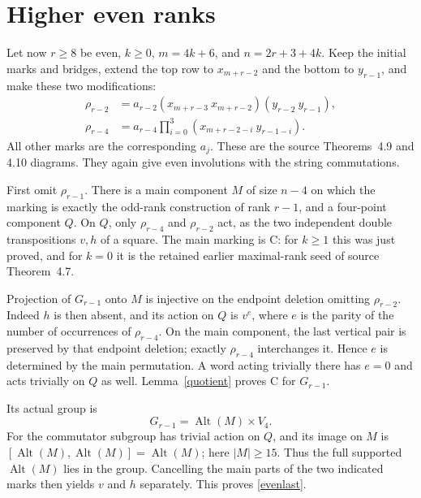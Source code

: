 \documentclass[11pt]{article}
\newcommand{\Alt}{\operatorname{Alt}}
\begin{document}
\section{Higher even ranks}
Let now $r\ge8$ be even, $k\ge0$, $m=4k+6$, and
$n=2r+3+4k$. Keep the initial marks and bridges, extend the top
row to $x_{m+r-2}$ and the bottom to $y_{r-1}$, and make these
two modifications:
\begin{align}
 \rho_{r-2}&=a_{r-2}
       (x_{m+r-3}\ x_{m+r-2})(y_{r-2}\ y_{r-1}),\label{extramatch}\\
 \rho_{r-4}&=a_{r-4}
       \prod_{i=0}^{3}(x_{m+r-2-i}\ y_{r-1-i}).\label{vertical4}
\end{align}
All other marks are the corresponding $a_j$. These are the
source Theorems~4.9 and 4.10 diagrams. They again give even
involutions with the string commutations.

First omit $\rho_{r-1}$. There is a main component $M$ of size
$n-4$ on which the marking is exactly the odd-rank construction
of rank $r-1$, and a four-point component $Q$. On $Q$, only
$\rho_{r-4}$ and $\rho_{r-2}$ act, as the two independent
double transpositions $v,h$ of a square. The main marking is C:
for $k\ge1$ this was just proved, and for $k=0$ it is the
retained earlier maximal-rank seed of source Theorem~4.7.

Projection of $G_{r-1}$ onto $M$ is injective on the endpoint
deletion omitting $\rho_{r-2}$. Indeed $h$ is then absent,
and its action on $Q$ is $v^e$, where $e$ is the parity of the
number of occurrences of $\rho_{r-4}$. On the main component,
the last vertical pair is preserved by that endpoint deletion;
exactly $\rho_{r-4}$ interchanges it. Hence $e$ is determined
by the main permutation. A word acting trivially there has
$e=0$ and acts trivially on $Q$ as well. Lemma~\ref{quotient}
proves C for $G_{r-1}$.

Its actual group is
\begin{equation}\label{evenlast}
 G_{r-1}=\Alt(M)\times V_4.
\end{equation}
For the commutator subgroup has trivial action on $Q$, and its
image on $M$ is $[\Alt(M),\Alt(M)]=\Alt(M)$; here
$|M|\ge15$. Thus the full supported $\Alt(M)$ lies in the
group. Cancelling the main parts of the two indicated marks
then yields $v$ and $h$ separately. This proves \eqref{evenlast}.
\end{document}
